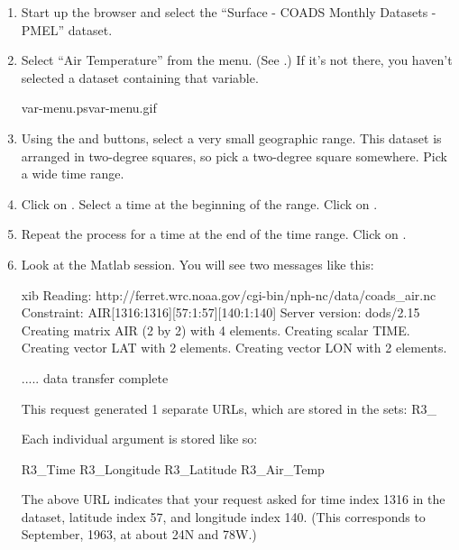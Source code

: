 \begin{enumerate}
  
\item Start up the browser and select the ``Surface - COADS Monthly
  Datasets - PMEL'' dataset.

\item Select ``Air Temperature'' from the  menu. (See
  .)  If it's not there, you haven't
  selected a dataset containing that variable. 

{var-menu.ps}{var-menu.gif}{}

\item Using the  and  buttons, select
  a very small geographic range. This dataset is arranged in
  two-degree squares, so pick a two-degree square somewhere. Pick a
  wide time range.
  
\item Click on . Select a time at the beginning
  of the range. Click on .
  
\item Repeat the process for a time at the end of the time range.
  Click on .
  
\item Look at the Matlab session. You will see two messages like this:

\begin{vcode}{xib}
Reading: http://ferret.wrc.noaa.gov/cgi-bin/nph-nc/data/coads_air.nc
  Constraint: AIR[1316:1316][57:1:57][140:1:140]
Server version: dods/2.15
Creating matrix AIR (2 by 2) with 4 elements.
Creating scalar TIME.
Creating vector LAT with 2 elements.
Creating vector LON with 2 elements.
                                  
          ..... data transfer complete
   
This request generated 1 separate URLs,
which are stored in the sets:  R3_   
   
Each individual argument is stored like so:
   
R3_Time R3_Longitude R3_Latitude R3_Air_Temp 
\end{vcode}

The above URL indicates that your request asked for time index 1316 in
the dataset, latitude index 57, and longitude index 140. (This
corresponds to September, 1963, at about 24\degree N and 78\degree W.)


\end{enumerate}
